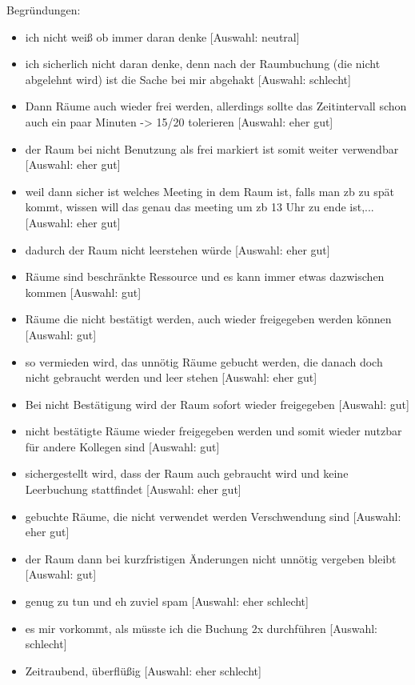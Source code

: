 \begin{enumerate}
    Begründungen:
    \begin{itemize}
        \item ich nicht weiß ob immer daran denke [Auswahl: neutral]
        \item ich sicherlich nicht daran denke, denn nach der Raumbuchung (die nicht abgelehnt wird) ist die Sache bei mir abgehakt [Auswahl: schlecht]
        \item Dann Räume auch wieder frei werden, allerdings sollte das Zeitintervall schon auch ein paar Minuten -> 15/20 tolerieren [Auswahl: eher gut]
        \item der Raum bei nicht Benutzung als frei markiert ist somit weiter verwendbar [Auswahl: eher gut]
        \item weil dann sicher ist welches Meeting in dem Raum ist, falls man zb zu spät kommt, wissen will das genau das meeting um zb 13 Uhr zu ende ist,... [Auswahl: eher gut]
        \item dadurch der Raum nicht leerstehen würde [Auswahl: eher gut]
        \item Räume sind beschränkte Ressource und es kann immer etwas dazwischen kommen [Auswahl: gut]
        \item Räume die nicht bestätigt werden, auch wieder freigegeben werden können [Auswahl: gut]
        \item so vermieden wird, das unnötig Räume gebucht werden, die danach doch nicht gebraucht werden und leer stehen [Auswahl: eher gut]
        \item Bei nicht Bestätigung wird der Raum sofort wieder freigegeben [Auswahl: gut]
        \item nicht bestätigte Räume wieder freigegeben werden und somit wieder nutzbar für andere Kollegen sind [Auswahl: gut]
        \item sichergestellt wird, dass der Raum auch gebraucht wird und keine Leerbuchung stattfindet [Auswahl: eher gut]
        \item gebuchte Räume, die nicht verwendet werden Verschwendung sind [Auswahl: eher gut]
        \item der Raum dann bei kurzfristigen Änderungen nicht unnötig vergeben bleibt [Auswahl: gut]
        \item genug zu tun und eh zuviel spam [Auswahl: eher schlecht]
        \item es mir vorkommt, als müsste ich die Buchung 2x durchführen [Auswahl: schlecht]
        \item Zeitraubend, überflüßig [Auswahl: eher schlecht]

\end{itemize}
\end{enumerate}
